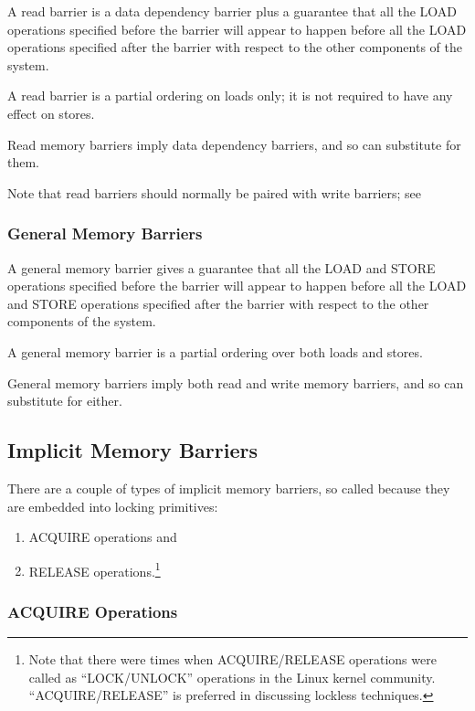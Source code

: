 A read barrier is a data dependency barrier plus a guarantee that all the
LOAD operations specified before the barrier will appear to happen before
all the LOAD operations specified after the barrier with respect to the
other components of the system.

A read barrier is a partial ordering on loads only; it is not required to
have any effect on stores.

Read memory barriers imply data dependency barriers, and so can substitute
for them.

Note that read barriers should normally be paired with write barriers;
see %

\subsubsection{General Memory Barriers}

A general memory barrier gives a guarantee that all the LOAD and STORE
operations specified before the barrier will appear to happen before all
the LOAD and STORE operations specified after the barrier with respect to
the other components of the system.

A general memory barrier is a partial ordering over both loads and stores.

General memory barriers imply both read and write memory barriers, and so
can substitute for either.

\subsection{Implicit Memory Barriers}

There are a couple of types of implicit memory barriers, so called
because they are embedded into locking primitives:

\begin{enumerate}
\item	ACQUIRE operations and
\item	RELEASE operations.\footnote{
		Note that there were times when ACQUIRE/RELEASE operations
		were called as ``LOCK/UNLOCK'' operations in the Linux
		kernel community. ``ACQUIRE/RELEASE'' is preferred in
		discussing lockless techniques.}
\end{enumerate}

\subsubsection{ACQUIRE Operations}

